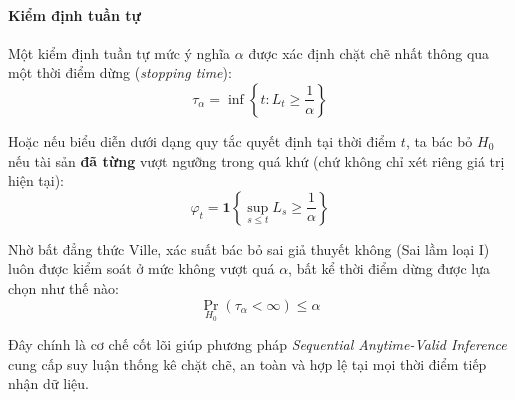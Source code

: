 \paragraph{Kiểm định tuần tự}

Một kiểm định tuần tự mức ý nghĩa $\alpha$ được xác định chặt chẽ nhất thông qua một thời điểm dừng (\textit{stopping time}):
\[
    \tau_\alpha = \inf\left\{t : L_t \ge \frac{1}{\alpha}\right\}
\]

Hoặc nếu biểu diễn dưới dạng quy tắc quyết định tại thời điểm $t$, ta bác bỏ $H_0$ nếu tài sản \textbf{đã từng} vượt ngưỡng trong quá khứ (chứ không chỉ xét riêng giá trị hiện tại):
\[
    \varphi_t = \mathbf{1}\left\{\sup_{s\le t} L_s \ge \frac{1}{\alpha}\right\}
\]

Nhờ bất đẳng thức Ville, xác suất bác bỏ sai giả thuyết không (Sai lầm loại I) luôn được kiểm soát ở mức không vượt quá $\alpha$, bất kể thời điểm dừng được lựa chọn như thế nào:
\[
    \Pr_{H_0}(\tau_\alpha < \infty) \le \alpha
\]

Đây chính là cơ chế cốt lõi giúp phương pháp \textit{Sequential Anytime-Valid Inference} cung cấp suy luận thống kê chặt chẽ, an toàn và hợp lệ tại mọi thời điểm tiếp nhận dữ liệu.